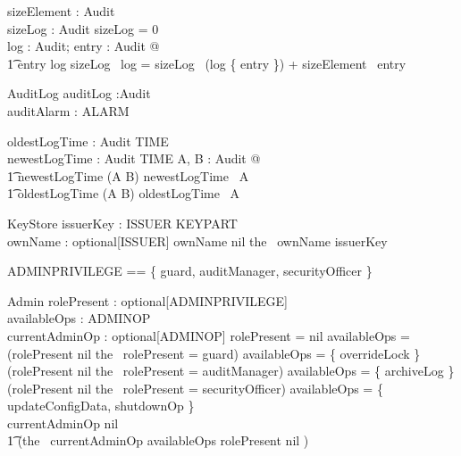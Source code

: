 \begin{axdef}
        sizeElement : Audit \fun \nat
\\      sizeLog : \finset Audit \fun \nat
\where
        sizeLog \emptyset = 0
\\      \forall log : \finset Audit; entry : Audit @
\\ \t1  entry \in log \implies sizeLog~ log = sizeLog~ (log
\setminus \{ entry \}) + sizeElement~ entry
\end{axdef}

\begin{schema}{AuditLog}
        auditLog :\finset Audit
\\      auditAlarm : ALARM
\end{schema}

\begin{axdef}
        oldestLogTime : \finset Audit \fun TIME 
\\      newestLogTime : \finset Audit \fun TIME
\where
        \forall A, B : \finset Audit @
\\  \t1 newestLogTime (A \cup B) \geq newestLogTime~ A
\\  \t1 \land oldestLogTime (A \cup B) \leq oldestLogTime~ A
\end{axdef}

\begin{schema}{KeyStore}
        issuerKey : ISSUER \pfun KEYPART
\\      ownName : optional[ISSUER]
\where
        ownName \neq nil \implies the~ ownName \in \dom issuerKey 
\end{schema}

\begin{zed}
        ADMINPRIVILEGE == \{ guard, auditManager, securityOfficer \}
\end{zed}

\begin{schema}{Admin}
        rolePresent : optional[ADMINPRIVILEGE]
\\      availableOps : \power ADMINOP
\\      currentAdminOp : optional[ADMINOP]
\where
        rolePresent = nil \implies availableOps = \emptyset 
\\      (rolePresent \neq nil \land the~ rolePresent = guard) \implies availableOps = 
        \{ overrideLock \}
\\      (rolePresent \neq nil \land the~ rolePresent = auditManager) \implies availableOps = 
        \{ archiveLog \}
\\      (rolePresent \neq nil \land the~ rolePresent = securityOfficer) \implies availableOps = 
        \{ updateConfigData, shutdownOp \}
\\      currentAdminOp \neq nil \implies 
\\ \t1 (the~ currentAdminOp \in availableOps \land rolePresent \neq nil )
\end{schema}


